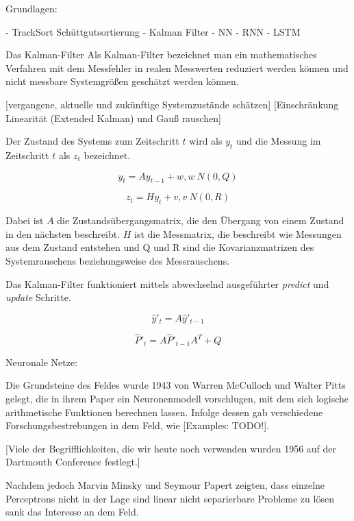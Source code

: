 

Grundlagen:


- TrackSort Schüttgutsortierung
- Kalman Filter
- NN
	- RNN
	- LSTM

Das Kalman-Filter
Als Kalman-Filter bezeichnet man ein mathematisches Verfahren mit dem Messfehler in realen Messwerten reduziert werden können und nicht messbare Systemgrößen geschätzt werden können. 


[vergangene, aktuelle und zukünftige Systemzustände schätzen]
[Einschränkung Linearität (Extended Kalman) und Gauß rauschen]

Der Zustand des Systems zum Zeitschritt $t$ wird als $y_t$ und die Messung im Zeitschritt $t$ als $z_t$ bezeichnet.

\begin{equation}
	y_t = A y_{t-1} + w, 	w ~ N(0, Q)
\end{equation}

\begin{equation}
	z_t = H y_{t} + v, 	v ~ N(0, R)
\end{equation}

Dabei ist $A$ die Zustandsübergangsmatrix, die den Übergang von einem Zustand in den nächsten beschreibt.
$H$ ist die Messmatrix, die beschreibt wie Messungen aus dem Zustand entstehen und Q und R sind die Kovarianzmatrizen des Systemrauschens beziehungsweise des Messrauschens. 

Das Kalman-Filter funktioniert mittels abwechselnd ausgeführter \textit{predict} und \textit{update} Schritte.

\begin{equation}
\hat{y}'_t = A \hat{y}'_{t-1}
\end{equation}

\begin{equation}
	\hat{P}'_t = A \hat{P}'_{t-1} A^\textit{T} + Q
\end{equation}








Neuronale Netze:

Die Grundsteine des Feldes wurde 1943 von Warren McCulloch und Walter Pitts gelegt, 
die in ihrem Paper ein Neuronenmodell vorschlugen, mit dem sich logische arithmetische Funktionen berechnen lassen. 
Infolge dessen gab verschiedene Forschungsbestrebungen in dem Feld, wie [Examples: TODO!].

[Viele der Begrifflichkeiten, die wir heute noch verwenden wurden 1956 auf der Dartmouth Conference festlegt.]

Nachdem jedoch Marvin Minsky und Seymour Papert zeigten, dass einzelne Perceptrons nicht in der Lage sind linear nicht separierbare Probleme zu lösen sank das Interesse an dem Feld.
